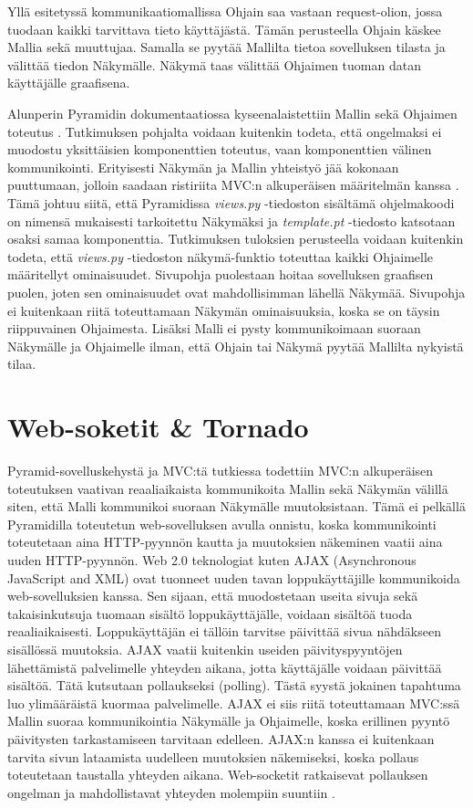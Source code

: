 \documentclass[utf8]{gradu3}
\begin{document}
Yllä esitetyssä kommunikaatiomallissa Ohjain saa vastaan request-olion, jossa tuodaan kaikki tarvittava tieto käyttäjästä. Tämän perusteella Ohjain käskee Mallia
sekä muuttujaa. Samalla se pyytää Mallilta tietoa sovelluksen tilasta ja välittää tiedon Näkymälle. Näkymä taas välittää Ohjaimen tuoman datan käyttäjälle graafisena.

Alunperin Pyramidin dokumentaatiossa kyseenalaistettiin Mallin sekä Ohjaimen toteutus \parencite{pyramid_intr}. Tutkimuksen pohjalta voidaan kuitenkin
todeta, että ongelmaksi ei muodostu yksittäisien komponenttien toteutus, vaan komponenttien välinen kommunikointi. Erityisesti Näkymän ja Mallin yhteistyö jää
kokonaan puuttumaan, jolloin saadaan ristiriita MVC:n alkuperäisen määritelmän kanssa \parencite[s. 1]{reenskaug_orig}. Tämä johtuu siitä, että Pyramidissa \emph{views.py} -tiedoston sisältämä ohjelmakoodi on nimensä mukaisesti tarkoitettu Näkymäksi ja
\emph{template.pt} -tiedosto katsotaan osaksi samaa komponenttia. Tutkimuksen tuloksien perusteella voidaan kuitenkin todeta, että \emph{views.py} -tiedoston näkymä-funktio toteuttaa kaikki
Ohjaimelle määritellyt ominaisuudet. Sivupohja puolestaan hoitaa sovelluksen graafisen puolen, joten sen ominaisuudet ovat mahdollisimman lähellä Näkymää. Sivupohja ei kuitenkaan riitä toteuttamaan Näkymän ominaisuuksia, koska se on täysin riippuvainen Ohjaimesta. Lisäksi Malli ei pysty kommunikoimaan suoraan Näkymälle ja Ohjaimelle ilman, että Ohjain tai Näkymä pyytää Mallilta nykyistä tilaa.

\chapter{Web-soketit \& Tornado}
Pyramid-sovelluskehystä ja MVC:tä tutkiessa todettiin MVC:n alkuperäisen toteutuksen vaativan reaaliaikaista kommunikoita Mallin sekä Näkymän välillä siten, että Malli kommunikoi suoraan Näkymälle muutoksistaan. Tämä ei pelkällä Pyramidilla toteutetun web-sovelluksen avulla onnistu, koska kommunikointi toteutetaan aina HTTP-pyynnön kautta ja muutoksien näkeminen vaatii aina uuden HTTP-pyynnön. Web 2.0 teknologiat kuten AJAX (Asynchronous JavaScript and XML) ovat tuonneet uuden tavan loppukäyttäjille kommunikoida web-sovelluksien kanssa. Sen sijaan, että muodostetaan useita sivuja sekä takaisinkutsuja tuomaan sisältö loppukäyttäjälle, voidaan sisältöä tuoda reaaliaikaisesti. Loppukäyttäjän ei tällöin tarvitse päivittää sivua nähdäkseen sisällössä muutoksia. AJAX vaatii kuitenkin useiden päivityspyyntöjen lähettämistä palvelimelle yhteyden aikana, jotta käyttäjälle voidaan päivittää sisältöä. Tätä kutsutaan pollaukseksi (polling). Tästä syystä jokainen tapahtuma luo ylimääräistä kuormaa palvelimelle\parencite{websocket_ajax}. AJAX ei siis riitä toteuttamaan MVC:ssä Mallin suoraa kommunikointia Näkymälle ja Ohjaimelle, koska erillinen pyyntö päivitysten tarkastamiseen tarvitaan edelleen. AJAX:n kanssa ei kuitenkaan tarvita sivun lataamista uudelleen muutoksien näkemiseksi, koska pollaus toteutetaan taustalla yhteyden aikana.  Web-socketit ratkaisevat pollauksen ongelman ja mahdollistavat yhteyden molempiin suuntiin \parencite[s. 1.1]{websocket}.
\end{document}
